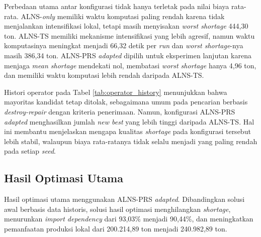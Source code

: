 \documentclass[journal]{IEEEtran}
\theoremstyle{definition}
\theoremstyle{definition}
\theoremstyle{plain}
\begin{document}
    Perbedaan utama antar konfigurasi tidak hanya terletak pada nilai biaya rata-rata. ALNS-\textit{only} memiliki waktu komputasi paling rendah karena tidak menjalankan intensifikasi lokal, tetapi masih menyisakan \textit{worst shortage} 444,30 ton. ALNS-TS memiliki mekanisme intensifikasi yang lebih agresif, namun waktu komputasinya meningkat menjadi 66,32 detik per \textit{run} dan \textit{worst shortage}-nya masih 386,34 ton. ALNS-PRS \textit{adapted} dipilih untuk eksperimen lanjutan karena menjaga \textit{mean shortage} mendekati nol, membatasi \textit{worst shortage} hanya 4,96 ton, dan memiliki waktu komputasi lebih rendah daripada ALNS-TS.

    Histori operator pada Tabel \ref{tab:operator_history} menunjukkan bahwa mayoritas kandidat tetap ditolak, sebagaimana umum pada pencarian berbasis \textit{destroy-repair} dengan kriteria penerimaan. Namun, konfigurasi ALNS-PRS \textit{adapted} menghasilkan jumlah \textit{new best} yang lebih tinggi daripada ALNS-TS. Hal ini membantu menjelaskan mengapa kualitas \textit{shortage} pada konfigurasi tersebut lebih stabil, walaupun biaya rata-ratanya tidak selalu menjadi yang paling rendah pada setiap \textit{seed}.

    \begin{table}[H]
    \centering
    \caption{Ringkasan \textit{outcome} operator pada eksperimen \textit{baseline}}
    \label{tab:operator_history}
    \end{table}

    \subsection{Hasil Optimasi Utama}
    Hasil optimasi utama menggunakan ALNS-PRS \textit{adapted}. Dibandingkan solusi awal berbasis data historis, solusi hasil optimasi menghilangkan \textit{shortage}, menurunkan \textit{import dependency} dari 93,03\% menjadi 90,44\%, dan meningkatkan pemanfaatan produksi lokal dari 200.214,89 ton menjadi 240.982,89 ton.
\end{document}
